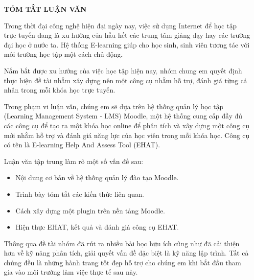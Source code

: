 \centerline{\bf \large\MakeUppercase{Tóm tắt luận văn}}
\vspace{20pt}

Trong thời đại công nghệ hiện đại ngày nay, việc sử dụng Internet để học tập trực tuyến đang là xu hướng của hầu hết các trung tâm giảng dạy hay các trường đại học ở nước ta. Hệ thống E-learning giúp cho học sinh, sinh viên tương tác với môi trường học tập một cách chủ động.

Nắm bắt được xu hướng của việc học tập hiện nay, nhóm chung em quyết định thực hiện đề tài nhằm xây dựng nên một công cụ nhằm hỗ trợ, đánh giá từng cá nhân trong mỗi khóa học trực tuyến.

Trong phạm vi luận văn, chúng em sẽ dựa trên hệ thống quản lý học tập (Learning Management System - LMS) Moodle, một hệ thống cung cấp đầy đủ các công cụ để tạo ra một khóa học online để phân tích và xây dựng một công cụ mới nhằm hỗ trợ và đánh giá năng lực của học viên trong mỗi khóa học. Công cụ có tên là E-learning Help And Assess Tool (EHAT).

Luận văn tập trung làm rõ một số vấn đề sau:

\begin{itemize}
	\item Nội dung cơ bản về hệ thống quản lý đào tạo Moodle.
	\item Trình bày tóm tắt các kiến thức liên quan.
	\item Cách xây dựng một plugin trên nền tảng Moodle.
	\item Hiện thực EHAT, kết quả và đánh giá công cụ EHAT.
\end{itemize}

Thông qua đề tài nhóm đã rút ra nhiều bài học hữu ích cũng như đã cải thiện hơn về kỹ năng phân tích, giải quyết vấn đề đặc biệt là kỹ năng lập trình. Tất cả chúng đều là những hành trang tốt đẹp hỗ trợ cho chúng em khi bắt đầu tham gia vào môi trường làm việc thực tế sau này.